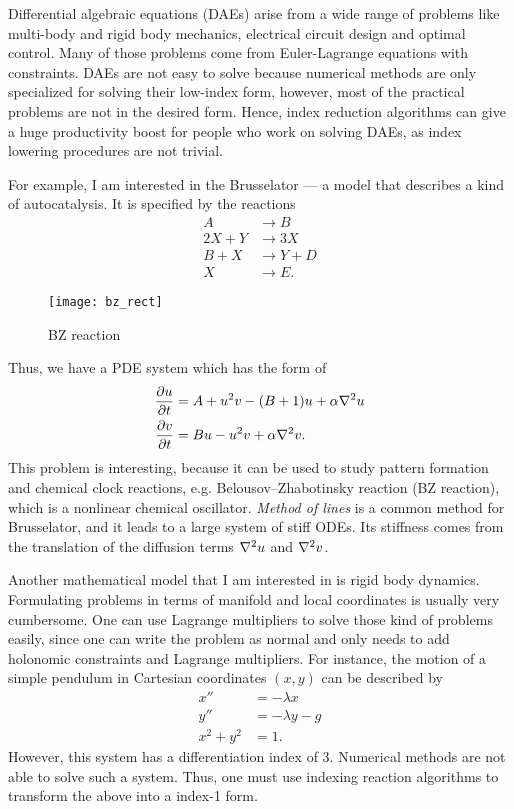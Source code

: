 \documentclass[12pt,a4paper]{article}
\begin{document}
Differential algebraic equations (DAEs) arise from a wide range of problems
like multi-body and rigid body mechanics, electrical circuit design and optimal
control. Many of those problems come from Euler-Lagrange equations with
constraints. DAEs are not easy to solve because numerical methods are only
specialized for solving their low-index form, however, most of the practical
problems are not in the desired form. Hence, index reduction algorithms can
give a huge productivity boost for people who work on solving DAEs, as index
lowering procedures are not trivial.

For example, I am interested in the Brusselator --- a model that describes a
kind of autocatalysis. It is specified by the reactions
\begin{align*}
  A&\longrightarrow B\\
  2X +  Y&\longrightarrow 3X\\
  B + X&\longrightarrow Y+D\\
  X&\longrightarrow E.
\end{align*}
\begin{wrapfigure}{l}{0.5\textwidth}
  \texttt{[image: bz\_rect]}
  \centering
  \caption{BZ reaction}
\end{wrapfigure}
Thus, we have a PDE system which has the form of
\begin{align}
  \pdv{u}{t} &= A + u^2v - (B+1)u + \alpha \laplacian{u} \\
  \pdv{v}{t} &= Bu - u^2v + \alpha \laplacian{v}.
\end{align}
This problem is interesting, because it can be used to study pattern formation
and chemical clock reactions, e.g. Belousov--Zhabotinsky reaction (BZ
reaction), which is a nonlinear chemical oscillator. \textit{Method of lines}
is a common method for Brusselator, and it leads to a large system of stiff
ODEs. Its stiffness comes from the translation of the diffusion terms
$\laplacian u$ and $\laplacian v$.

Another mathematical model that I am interested in is rigid body dynamics.
Formulating problems in terms of manifold and local coordinates is usually very
cumbersome. One can use Lagrange multipliers to solve those kind of problems
easily, since one can write the problem as normal and only needs to add
holonomic constraints and Lagrange multipliers. For instance, the motion of a
simple pendulum in Cartesian coordinates $(x, y)$ can be described by
\begin{align}
  x'' &= -\lambda x \\
  y'' &= -\lambda y - g \\
  x^2 + y^2 &= 1.
\end{align}
However, this system has a differentiation index of 3. Numerical methods are
not able to solve such a system. Thus, one must use indexing reaction
algorithms to transform the above into a index-1 form.
\end{document}
